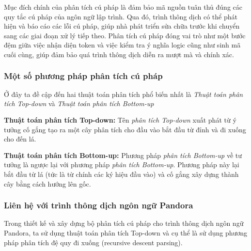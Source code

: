     
    

Mục đích chính của phân tích cú pháp là đảm bảo mã nguồn tuân thủ đúng các quy tắc cú pháp của ngôn ngữ lập trình. Qua đó, trình thông dịch có thể phát hiện và báo cáo các lỗi cú pháp, giúp nhà phát triển sửa chữa trước khi chuyển sang các giai đoạn xử lý tiếp theo. Phân tích cú pháp đóng vai trò như một bước đệm giữa việc nhận diện token và việc kiểm tra ý nghĩa logic cũng như sinh mã cuối cùng, giúp đảm bảo quá trình thông dịch diễn ra mượt mà và chính xác.
\subsubsection{Một số phương pháp phân tích cú pháp}
Ở đây ta đề cập đến hai thuật toán phân tích phổ biến nhất là \textit{Thuật toán phân tích Top-down} và \textit{Thuật toán phân tích Bottom-up}

\textbf{Thuật toán phân tích Top-down:}
Tên \textit{phân tích Top-down} xuất phát từ ý tưởng cố gắng tạo ra một cây phân tích cho đầu vào bắt đầu từ đỉnh và đi xuống cho đến lá.

\textbf{Thuật toán phân tích Bottom-up:}
Phương pháp \textit{phân tích Bottom-up} về tư tưởng là ngược lại với phương pháp \textit{phân tích Bottom-up}. Phương pháp này lại bắt đầu từ lá (tức là từ chính các ký hiệu đầu vào) và cố gắng xây dựng thành cây bằng cách hướng lên gốc.

\subsubsection{Liên hệ với trình thông dịch ngôn ngữ Pandora}
Trong thiết kế và xây dựng bộ phân tích cú pháp cho trình thông dịch ngôn ngữ Pandora, ta sử dụng thuật toán phân tích Top-down và cụ thể là sử dụng phương pháp phân tích đệ quy đi xuống (recursive descent parsing).

